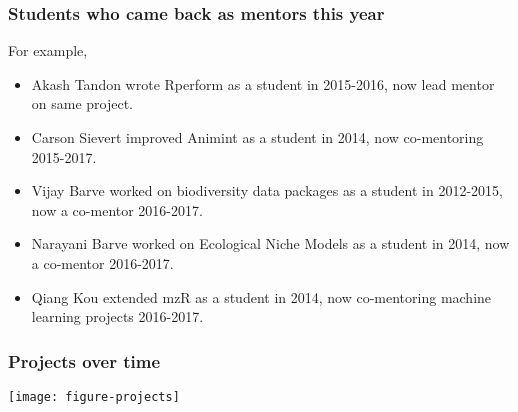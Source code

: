 \documentclass{beamer}
\begin{document}

\begin{frame}[fragile]
  \frametitle{Students who came back as mentors this year}
  For example, 
  \begin{itemize}
  \item Akash Tandon wrote Rperform as a student in 2015-2016, now
    lead mentor on same project.
  \item Carson Sievert improved Animint as a student in 2014,
    now co-mentoring 2015-2017.
  \item Vijay Barve worked on biodiversity data packages as a student
    in 2012-2015, now a co-mentor 2016-2017.
  \item Narayani Barve worked on Ecological Niche Models as a student
    in 2014, now a co-mentor 2016-2017.
  \item Qiang Kou extended mzR as a student in 2014, now co-mentoring
    machine learning projects 2016-2017.
  \end{itemize}
\end{frame}


\begin{frame}
  \frametitle{Projects over time}
  \texttt{[image: figure-projects]}
\end{frame}
\end{document}
